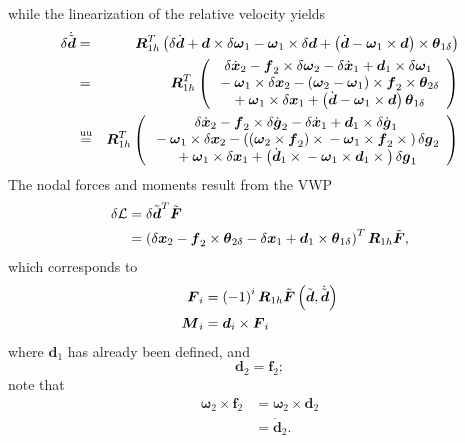 \documentclass[10pt,dvips,fleqn,subeqn]{report}
\newcommand{\T}[1]{\boldsymbol{#1}}
\newcommand{\equu}{\overset{\text{uu}}{=}}
\begin{document}
while the linearization of the relative velocity yields
\begin{eqnarray*}
	\delta\dot{\tilde{\T{d}}} & = & \T{R}_{1h}^T\plbr{
		\delta\dot{\T{d}}
		+ \T{d} \times \delta\T{\omega}_1
		- \T{\omega}_1 \times \delta\T{d}
		+ \plbr{
			\dot{\T{d}}
			- \T{\omega}_1 \times \T{d}
		}\times\T{\theta}_{1\delta}
	} \\
	& = & \T{R}_{1h}^T\plbr{\cvvect{
		\delta\dot{\T{x}}_2
		- \T{f}_2\times\delta\T{\omega}_2
		- \delta\dot{\T{x}}_1
		+ \T{d}_1\times\delta\T{\omega}_1 \\
	\mbox{} - \T{\omega}_1 \times \delta\T{x}_2
		- \plbr{
			\T{\omega}_2 
			- \T{\omega}_1
		} \times \T{f}_2 \times\T{\theta}_{2\delta} \\
	\mbox{} + \T{\omega}_1 \times \delta\T{x}_1
		+ \plbr{
			\dot{\T{d}} - \T{\omega}_1 \times \T{d}
		} \T{\theta}_{1\delta}
	}} \\
	& \equu & \T{R}_{1h}^T\plbr{\cvvect{
		\delta\dot{\T{x}}_2
		- \T{f}_2\times\delta\dot{\T{g}}_2
		- \delta\dot{\T{x}}_1
		+ \T{d}_1\times\delta\dot{\T{g}}_1 \\
	\mbox{} - \T{\omega}_1 \times \delta\T{x}_2
		- \plbr{
			\plbr{\T{\omega}_2 \times \T{f}_2}\times{}
			- \T{\omega}_1 \times \T{f}_2 \times{}
		} \delta\T{g}_2 \\
	\mbox{} + \T{\omega}_1 \times \delta\T{x}_1
		+ \plbr{
			\dot{\T{d}}_1 \times{}
			- \T{\omega}_1 \times \T{d}_1\times{}
		} \delta\T{g}_1
	}}
\end{eqnarray*}
The nodal forces and moments result from the VWP
\begin{align}
	\delta\mathcal{L} &= \delta \tilde{\T{d}}^T \tilde{\T{F}} \\
	&= \plbr{
		\delta{\T{x}}_2
		- \T{f}_2\times\T{\theta}_{2\delta}
		- \delta{\T{x}}_1
		+ \T{d}_1\times\T{\theta}_{1\delta}
	}^T \T{R}_{1h} \tilde{\T{F}} ,
\end{align}
which corresponds to
\begin{align}
	\T{F}_i &= \plbr{ -1 }^i \T{R}_{1h} \tilde{\T{F}}\plbr{\tilde{\T{d}}, \dot{\tilde{\T{d}}}} \\
	\T{M}_i &= \T{d}_i \times \T{F}_i
\end{align}
where $\T{d}_1$ has already been defined, and
\begin{equation}
	\T{d}_2 = \T{f}_2 ;
\end{equation}
note that
\begin{align}
	\T{\omega}_2\times\T{f}_2
	&= \T{\omega}_2\times\T{d}_2 \\
	&= \dot{\T{d}}_2 .
\end{align}
\end{document}
